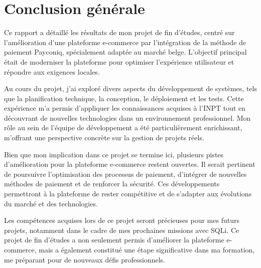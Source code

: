 \chapter*{Conclusion générale}


Ce rapport a détaillé les résultats de mon projet de fin d’études, centré sur l'amélioration d'une plateforme e-commerce par l’intégration de la méthode de paiement Payconiq, spécialement adaptée au marché belge. L’objectif principal était de moderniser la plateforme pour optimiser l’expérience utilisateur et répondre aux exigences locales.

Au cours du projet, j’ai exploré divers aspects du développement de systèmes, tels que la planification technique, la conception, le déploiement et les tests. Cette expérience m’a permis d’appliquer les connaissances acquises à l’INPT tout en découvrant de nouvelles technologies dans un environnement professionnel. Mon rôle au sein de l’équipe de développement a été particulièrement enrichissant, m’offrant une perspective concrète sur la gestion de projets réels.

Bien que mon implication dans ce projet se termine ici, plusieurs pistes d’amélioration pour la plateforme e-commerce restent ouvertes. Il serait pertinent de poursuivre l’optimisation des processus de paiement, d’intégrer de nouvelles méthodes de paiement et de renforcer la sécurité. Ces développements permettront à la plateforme de rester compétitive et de s’adapter aux évolutions du marché et des technologies.

Les compétences acquises lors de ce projet seront précieuses pour mes futurs projets, notamment dans le cadre de mes prochaines missions avec SQLi. Ce projet de fin d’études a non seulement permis d'améliorer la plateforme e-commerce, mais a également constitué une étape significative dans ma formation, me préparant pour de nouveaux défis professionnels.






